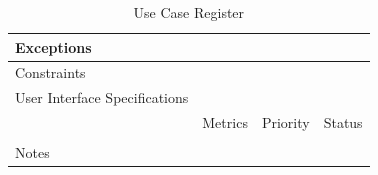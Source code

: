 \begin{table}[H]
\begin{tabularx}{\linewidth}{|l|X|X|X|}
            \hline Exceptions                    & \multicolumn{3}{l|}{}                                                                                 \\

            \hline Constraints                   & \multicolumn{3}{l|}{}                                                                                 \\

            \hline User Interface Specifications & \multicolumn{3}{l|}{}                                                                                 \\

            \hline \multirow{2}{*}{}             & Metrics                                                                           & Priority & Status \\
            \cline{2-4}                          &                                                                                   &          &        \\
            \hline Notes                         & \multicolumn{3}{l|}{}                                                                                 \\
            \hline
      \end{tabularx}
      \caption{Use Case Register}
      \label{tab:use_case_register}
\end{table}


